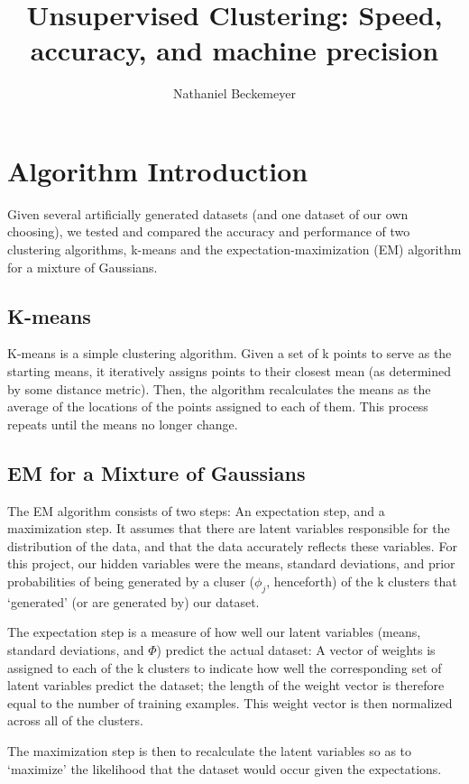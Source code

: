 \documentclass{journal}
\title{Unsupervised Clustering: Speed, accuracy, and machine precision}
\author{Nathaniel Beckemeyer}
\begin{document}
\maketitle{}

\section{Algorithm Introduction}
Given several artificially generated datasets (and one dataset of our own
choosing), we tested and compared the accuracy and performance of two clustering
algorithms, k-means and the expectation-maximization (EM) algorithm for a
mixture of Gaussians.

\subsection{K-means}
K-means is a simple clustering algorithm. Given a set of k points to serve as
the starting means, it iteratively assigns points to their closest mean (as
determined by some distance metric). Then, the algorithm recalculates the means
as the average of the locations of the points assigned to each of them. This
process repeats until the means no longer change.

\subsection{EM for a Mixture of Gaussians}
The EM algorithm consists of two steps: An expectation step, and a maximization
step. It assumes that there are latent variables responsible for the
distribution of the data, and that the data accurately reflects these variables.
For this project, our hidden variables were the means, standard deviations, and
prior probabilities of being generated by a cluser ($\phi_{j}$, henceforth)
of the k clusters that `generated' (or are generated by) our dataset.

The expectation step is a measure of how well our latent variables (means,
standard deviations, and $\Phi{}$) predict the actual dataset: A vector of
weights is assigned to each of the k clusters to indicate how well the
corresponding set of latent variables predict the dataset; the length of the
weight vector is therefore equal to the number of training examples. This weight
vector is then normalized across all of the clusters.

The maximization step is then to recalculate the latent variables so as to
`maximize' the likelihood that the dataset would occur given the expectations.
\end{document}
